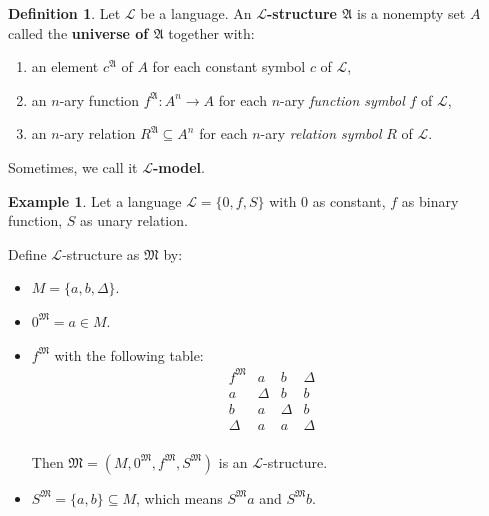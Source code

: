 \documentclass[11pt,letterpaper]{book}
\theoremstyle{definition}
\newtheorem{definition}{Definition}[section]
\newtheorem{example}{Example}[section]
\begin{document}
\begin{definition}\label{def:model}
Let $\mathcal{L}$ be a language. An \textbf{$\mathcal{L}$-structure
$\mathfrak{A}$} is a nonempty set $A$ called the \textbf{universe of
$\mathfrak{A}$} together with:
\begin{enumerate}
\item{an element $c^{\mathfrak{A}} $ of $A$ for each constant symbol $c$
of $\mathcal{L}$,}
\item{an $n$-ary function $f^{\mathfrak{A}}: A^{n} \rightarrow A$ for
each $n$-ary \emph{function symbol} $f$ of $\mathcal{L}$,}
\item{an $n$-ary relation $R^{\mathfrak{A}} \subseteq A^n $ for each
$n$-ary \emph{relation symbol} $R$ of $\mathcal{L}$.}
\end{enumerate}

Sometimes, we call it \textbf{$\mathcal{L}$-model}.

\end{definition}

\begin{example}
Let a language $\mathcal{L}= \{ 0, f, S \}$ with $0$ as constant, $f$ as
binary function, $S$ as unary relation.

Define $\mathcal{L}$-structure as $\mathfrak{M}$ by:
\begin{itemize}
\item{$M = \{a, b, \Delta \}$.}
\item{$0^{\mathfrak{M}} = a \in M$.}
\item{$f^{\mathfrak{M}}$ with the following table:
\begin{equation}
\begin{array}{c|c|c|c}
f^{\mathfrak{M}} & a & b & \Delta \\
\hline
a & \Delta & b & b \\
\hline
b & a & \Delta & b \\
\hline
\Delta & a & a & \Delta \\
\end{array} \nonumber
\end{equation}

Then $\mathfrak{M} = (M, 0^{\mathfrak{M}}, f^{\mathfrak{M}},
S^{\mathfrak{M}})$ is an $\mathcal{L}$-structure.

}
\item{$S^{\mathfrak{M}} =\{a, b\} \subseteq M$, which means
$S^{\mathfrak{M}} a$ and $S^{\mathfrak{M}} b$.}
\end{itemize}

\end{example}
\end{document}
